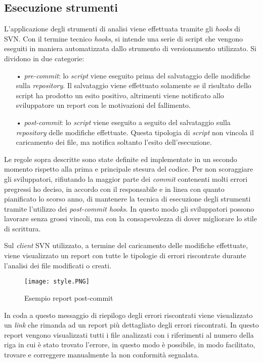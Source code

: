 \subsection{Esecuzione strumenti}
L'applicazione degli strumenti di analisi viene effettuata tramite gli \textit{hooks} di SVN. 
Con il termine tecnico \textit{hooks}, si intende una serie di script che vengono eseguiti in maniera automatizzata dallo strumento di versionamento utilizzato. Si dividono in due categorie:
\begin{itemize}
\item[•] \textit{pre-commit}: lo \textit{script} viene eseguito prima del salvataggio delle modifiche sulla \textit{repository}. Il salvataggio viene effettuato solamente se il risultato dello script ha prodotto un esito positivo, altrimenti viene notificato allo sviluppatore un report con le motivazioni del fallimento.

\item[•] \textit{post-commit}: lo \textit{script} viene eseguito a seguito del salvataggio sulla \textit{repository} delle modifiche effettuate. Questa tipologia di \textit{script} non vincola il caricamento dei file, ma notifica soltanto l'esito dell'esecuzione.
\end{itemize}

Le regole sopra descritte sono state definite ed implementate in un secondo momento rispetto alla prima e principale stesura del codice. Per non scoraggiare gli sviluppatori, rifiutando la maggior parte dei \textit{commit} contenenti molti errori pregressi ho deciso, in accordo con il responsabile e in linea con quanto pianificato lo scorso anno, di mantenere la tecnica di esecuzione degli strumenti tramite l'utilizzo dei \textit{post-commit hooks}. In questo modo gli sviluppatori possono lavorare senza grossi vincoli, ma con la consapevolezza di dover migliorare lo stile di scrittura. 

Sul \textit{client} SVN utilizzato, a termine del caricamento delle modifiche effettuate, viene visualizzato un report con tutte le tipologie di errori riscontrate durante l'analisi dei file modificati o creati.

\begin{figure}[H]
  \centering
  \texttt{[image: style.PNG]}
  \caption{Esempio report post-commit}
\end{figure}

In coda a questo messaggio di riepilogo degli errori riscontrati viene visualizzato un \textit{link} che rimanda ad un report più dettagliato degli errori riscontrati. In questo report vengono visualizzati tutti i file analizzati con i riferimenti al numero della riga in cui è stato trovato l'errore, in questo modo è possibile, in modo facilitato, trovare e correggere manualmente la non conformità segnalata.

